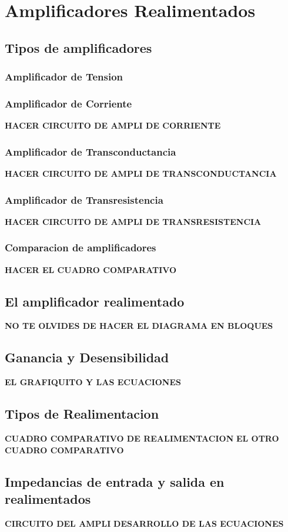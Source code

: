 \chapter{Amplificadores Realimentados}

\section{Tipos de amplificadores}
\subsection{Amplificador de Tension}

\subsection{Amplificador de Corriente}
\textbf{HACER CIRCUITO DE AMPLI DE CORRIENTE}

\subsection{Amplificador de Transconductancia}
\textbf{HACER CIRCUITO DE AMPLI DE TRANSCONDUCTANCIA}

\subsection{Amplificador de Transresistencia}
\textbf{HACER CIRCUITO DE AMPLI DE TRANSRESISTENCIA}

\subsection{Comparacion de amplificadores}
\textbf{HACER EL CUADRO COMPARATIVO}


\section{El amplificador realimentado}
\textbf{NO TE OLVIDES DE HACER EL DIAGRAMA EN BLOQUES}

\section{Ganancia y Desensibilidad}
\textbf{EL GRAFIQUITO Y LAS ECUACIONES}


\section{Tipos de Realimentacion}
\textbf{CUADRO COMPARATIVO DE REALIMENTACION}
\textbf{EL OTRO CUADRO COMPARATIVO}


\section{Impedancias de entrada y salida en realimentados}
\textbf{CIRCUITO DEL AMPLI}
\textbf{DESARROLLO DE LAS ECUACIONES}
